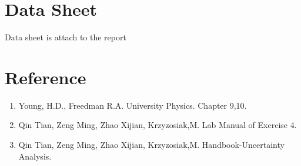 \documentclass[12pt]{article}
\begin{document}
\section{Data Sheet}
Data sheet is attach to the report
\section{Reference}
\begin{enumerate}[-]
\item Young, H.D., Freedman R.A. University Physics. Chapter 9,10.
\item Qin Tian, Zeng Ming, Zhao Xijian, Krzyzosiak,M. Lab Manual of Exercise 4.
\item Qin Tian, Zeng Ming, Zhao Xijian, Krzyzosiak,M. Handbook-Uncertainty Analysis.
\end{enumerate}
\end{document}
